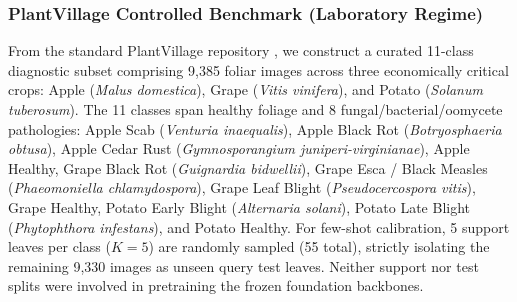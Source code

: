 \documentclass[preprint,12pt]{elsarticle}
\begin{document}
\subsubsection{PlantVillage Controlled Benchmark (Laboratory Regime)}
From the standard PlantVillage repository \cite{hughes2012plantvillage}, we construct a curated 11-class diagnostic subset comprising 9,385 foliar images across three economically critical crops: Apple (\textit{Malus domestica}), Grape (\textit{Vitis vinifera}), and Potato (\textit{Solanum tuberosum}). The 11 classes span healthy foliage and 8 fungal/bacterial/oomycete pathologies: Apple Scab (\textit{Venturia inaequalis}), Apple Black Rot (\textit{Botryosphaeria obtusa}), Apple Cedar Rust (\textit{Gymnosporangium juniperi-virginianae}), Apple Healthy, Grape Black Rot (\textit{Guignardia bidwellii}), Grape Esca / Black Measles (\textit{Phaeomoniella chlamydospora}), Grape Leaf Blight (\textit{Pseudocercospora vitis}), Grape Healthy, Potato Early Blight (\textit{Alternaria solani}), Potato Late Blight (\textit{Phytophthora infestans}), and Potato Healthy. For few-shot calibration, 5 support leaves per class ($K=5$) are randomly sampled (55 total), strictly isolating the remaining 9,330 images as unseen query test leaves. Neither support nor test splits were involved in pretraining the frozen foundation backbones.
\end{document}
